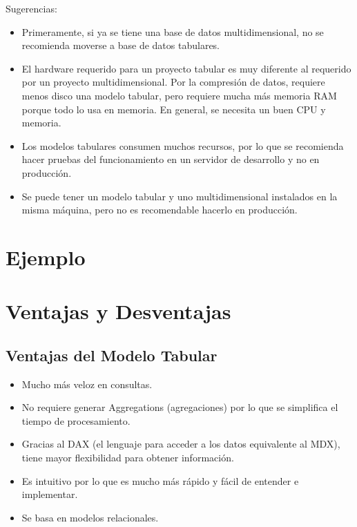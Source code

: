 \documentclass[preprint,12pt]{elsarticle}
\begin{document}
Sugerencias:
\begin{itemize}
	\item Primeramente, si ya se tiene una base de datos multidimensional, no se recomienda moverse a base de datos tabulares.
	\item El hardware requerido para un proyecto tabular es muy diferente al requerido por un proyecto multidimensional. Por la compresión de datos, requiere menos disco una modelo tabular, pero requiere mucha más memoria RAM porque todo lo usa en memoria. En general, se necesita un buen CPU y memoria.
	\item Los modelos tabulares consumen muchos recursos, por lo que se recomienda hacer pruebas del funcionamiento en un servidor de desarrollo y no en producción.
	\item Se puede tener un modelo tabular y uno multidimensional instalados en la misma máquina, pero no es recomendable hacerlo en producción.
\end{itemize}







\section{Ejemplo}
 
\section{Ventajas y Desventajas}

\subsection{Ventajas del Modelo Tabular}

\begin{itemize}
	\item Mucho más veloz en consultas.
	\item No requiere generar Aggregations (agregaciones) por lo que se simplifica el tiempo de procesamiento.
	\item Gracias al DAX (el lenguaje para acceder a los datos equivalente al MDX), tiene mayor flexibilidad para obtener información.
	\item Es intuitivo por lo que es mucho más rápido y fácil de entender e implementar.
	\item Se basa en modelos relacionales.
\end{itemize}
\end{document}
